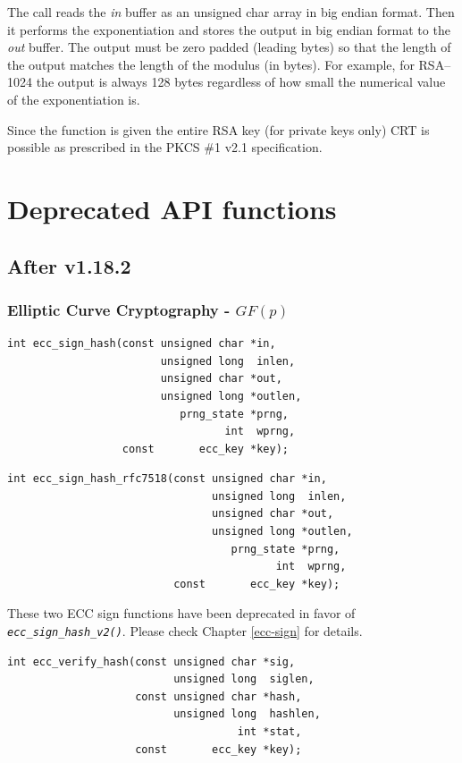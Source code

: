 \documentclass[synpaper]{book}
\newcommand{\code}[1]{\texttt{\textit{#1}}}
\newcommand{\mysection}[1]    %
	{                   %
	\section{#1}
   \markboth{\textsf{www.libtom.net}}{\thesection ~ {#1}}
	}
\begin{document}
The call reads the \textit{in} buffer as an unsigned char array in big endian format.  Then it performs the exponentiation and stores the output in big endian format
to the \textit{out} buffer.  The output must be zero padded (leading bytes) so that the length of the output matches the length of the modulus (in bytes).  For example,
for RSA--1024 the output is always 128 bytes regardless of how small the numerical value of the exponentiation is.

Since the function is given the entire RSA key (for private keys only) CRT is possible as prescribed in the PKCS \#1 v2.1 specification.


\chapter{Deprecated API functions}

\mysection{After v1.18.2}

\subsection{Elliptic Curve Cryptography - $GF(p)$}

\begin{verbatim}
int ecc_sign_hash(const unsigned char *in,
                        unsigned long  inlen,
                        unsigned char *out,
                        unsigned long *outlen,
                           prng_state *prng,
                                  int  wprng,
                  const       ecc_key *key);
\end{verbatim}

\begin{verbatim}
int ecc_sign_hash_rfc7518(const unsigned char *in,
                                unsigned long  inlen,
                                unsigned char *out,
                                unsigned long *outlen,
                                   prng_state *prng,
                                          int  wprng,
                          const       ecc_key *key);
\end{verbatim}

These two ECC sign functions have been deprecated in favor of \code{ecc\_sign\_hash\_v2()}.
Please check Chapter \ref{ecc-sign} for details.

\begin{verbatim}
int ecc_verify_hash(const unsigned char *sig,
                          unsigned long  siglen,
                    const unsigned char *hash,
                          unsigned long  hashlen,
                                    int *stat,
                    const       ecc_key *key);
\end{verbatim}
\end{document}
